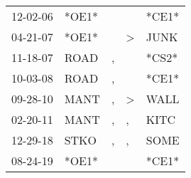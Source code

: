 \begin{supertabular}{lllll}
 12-02-06 &  *OE1* &               &               &  *CE1* \\
 04-21-07 &  *OE1* &               &  \textgreater &   JUNK \\
 11-18-07 &   ROAD &             , &               &  *CS2* \\
 10-03-08 &   ROAD &             , &               &  *CE1* \\
 09-28-10 &   MANT &             , &  \textgreater &   WALL \\
 02-20-11 &   MANT &             , &             , &   KITC \\
 12-29-18 &   STKO &             , &             , &   SOME \\
 08-24-19 &  *OE1* &               &               &  *CE1* \\
\end{supertabular}
